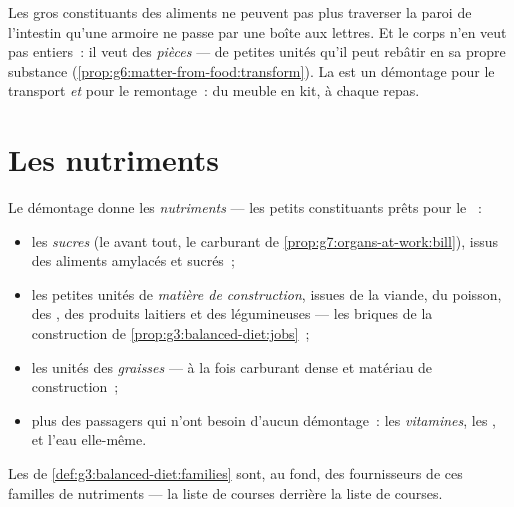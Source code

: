 \begin{remark}\label{rem:g7:digestion-and-nutrients:why}
Les gros constituants des aliments ne peuvent pas plus traverser la
paroi de l'intestin qu'une armoire ne passe par une boîte aux
lettres. Et le corps n'en veut pas entiers~: il veut des
\emph{pièces} --- de petites unités qu'il peut rebâtir en sa propre
substance (\cref{prop:g6:matter-from-food:transform}). La 
est un démontage pour le transport \emph{et} pour le remontage~: du
meuble en kit, à chaque repas.
\end{remark}

\section{Les nutriments}

\begin{definition}\label{def:g7:digestion-and-nutrients:families}
Le démontage donne les \emph{nutriments} --- les
petits constituants prêts pour le ~:
\begin{itemize}
  \item les \emph{sucres} (le  avant tout, le carburant de
        \cref{prop:g7:organs-at-work:bill}), issus des aliments
        amylacés et sucrés~;
  \item les petites unités de \emph{matière de construction},
        issues de la viande, du poisson, des , des produits
        laitiers et des légumineuses --- les briques de la
        construction de \cref{prop:g3:balanced-diet:jobs}~;
  \item les unités des \emph{graisses} --- à la fois carburant
        dense et matériau de construction~;
  \item plus des passagers qui n'ont besoin d'aucun démontage~: les
        \emph{vitamines}, les \emph{}, et l'eau
        elle-même.
\end{itemize}
Les  de \cref{def:g3:balanced-diet:families}
sont, au fond, des fournisseurs de ces familles de nutriments ---
la liste de courses derrière la liste de courses.
\end{definition}

